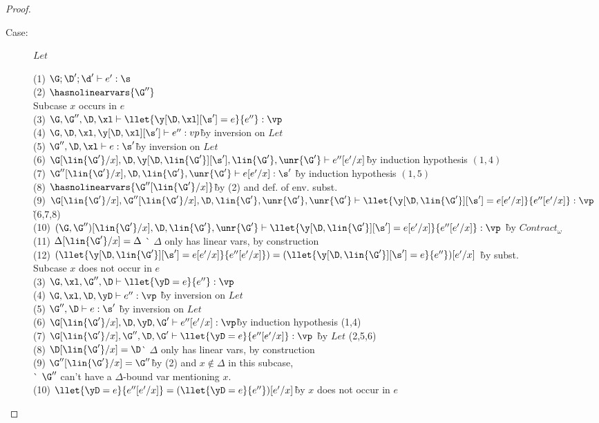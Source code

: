 \begin{proof}
\begin{description}
\item[Case:] $Let$
\begin{tabbing}
  (1) $\G; \D'; \d' \vdash e' : \s$\\
  (2) $\hasnolinearvars{\G''}$\\
  Subcase $x$ occurs in $e$\\
  (3) $\G, \G'', \D, \xl \vdash \llet{\y[\D,\xl][\s'] = e}{e''} : \vp$\\
  (4) $\G, \D, \xl, \y[\D,\xl][\s'] \vdash e'' : vp$\` by inversion on $Let$\\
  (5) $\G'', \D, \xl \vdash e : \s'$\` by inversion on $Let$\\
  (6) $\G[\lin{\G'}/x], \D, \y[\D,\lin{\G'}][\s'], \lin{\G'}, \unr{\G'} \vdash
  e''[e'/x]$\` by induction hypothesis $(1,4)$\\
  (7) $\G''[\lin{\G'}/x], \D, \lin{\G'}, \unr{\G'} \vdash e[e'/x] : \s'$ \` by induction hypothesis $(1,5)$\\
  (8) $\hasnolinearvars{\G''[\lin{\G'}/x]}$\` by (2) and def. of env. subst.\\
  (9) $\G[\lin{\G'}/x], \G''[\lin{\G'}/x], \D, \lin{\G'}, \unr{\G'}, \unr{\G'}
  \vdash \llet{\y[\D,\lin{\G'}][\s'] = e[e'/x]}{e''[e'/x]} : \vp$ \` (6,7,8)\\ %
  (10) $(\G, \G'')[\lin{\G'}/x], \D, \lin{\G'}, \unr{\G'} \vdash
  \llet{\y[\D,\lin{\G'}][\s'] = e[e'/x]}{e''[e'/x]} : \vp$ \` by $Contract_\omega$\\
  (11) $\Delta[\lin{\G'}/x] = \Delta$ \` $\Delta$ only has linear vars, by construction\\
  (12) $(\llet{\y[\D,\lin{\G'}][\s'] = e[e'/x]}{e''[e'/x]}) =
  (\llet{\y[\D,\lin{\G'}][\s'] = e}{e''})[e'/x]$ \` by subst.\\
  Subcase $x$ does not occur in $e$\\
  (3) $\G, \xl, \G'', \D \vdash \llet{\yD = e}{e''} : \vp$\\
  (4) $\G, \xl, \D, \yD \vdash e'' : \vp$ \` by inversion on $Let$\\
  (5) $\G'', \D \vdash e : \s'$ \` by inversion on $Let$\\
  (6) $\G[\lin{\G'}/x], \D, \yD, \G' \vdash e''[e'/x] : \vp$\` by induction hypothesis (1,4)\\
  (7) $\G[\lin{\G'}/x], \G'', \D, \G' \vdash \llet{\yD = e}{e''[e'/x]} : \vp$ \`
  by $Let$ (2,5,6)\\
  (8) $\D[\lin{\G'}/x] = \D$\` $\Delta$ only has linear vars, by
  construction\\
  (9) $\G''[\lin{\G'}/x] = \G''$\` by (2) and $x \notin \Delta$ in this
  subcase,\\
  \` $\G''$ can't have a $\Delta$-bound var mentioning $x$.\\
  (10) $\llet{\yD = e}{e''[e'/x]} = (\llet{\yD = e}{e''})[e'/x]$\` by $x$ does
  not occur in $e$\\
\end{tabbing}


\end{description}
\end{proof}
